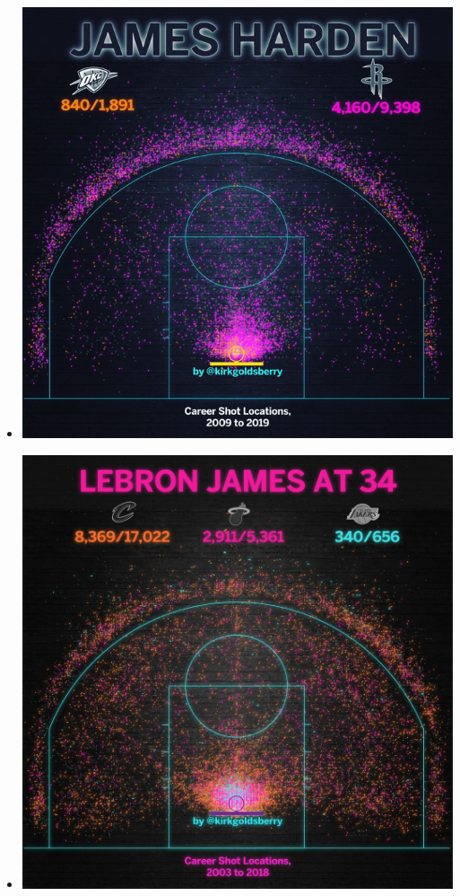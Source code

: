 \documentclass[]{book}
\providecommand{\tightlist}{%
  \setlength{\itemsep}{0pt}\setlength{\parskip}{0pt}}
\begin{document}
\begin{itemize}
\tightlist
\item
  \includegraphics{James_Harden.jpg}
\item
  \includegraphics{Lebron_James.jpg}

\end{itemize}
\end{document}
